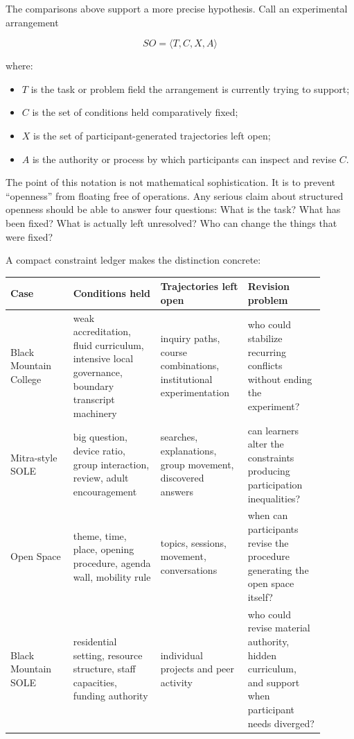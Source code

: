 \documentclass[11pt]{article}
\begin{document}
The comparisons above support a more precise hypothesis. Call an experimental arrangement

\[
SO = \langle T, C, X, A \rangle
\]

where:

\begin{itemize}[leftmargin=1.6em]
\item $T$ is the task or problem field the arrangement is currently trying to support;
\item $C$ is the set of conditions held comparatively fixed;
\item $X$ is the set of participant-generated trajectories left open;
\item $A$ is the authority or process by which participants can inspect and revise $C$.
\end{itemize}

The point of this notation is not mathematical sophistication. It is to prevent ``openness'' from floating free of operations. Any serious claim about structured openness should be able to answer four questions: What is the task? What has been fixed? What is actually left unresolved? Who can change the things that were fixed?

A compact constraint ledger makes the distinction concrete:

\begin{center}
\small
\begin{tabular}{p{0.18\linewidth} p{0.25\linewidth} p{0.25\linewidth} p{0.22\linewidth}}
\toprule
\textbf{Case} & \textbf{Conditions held} & \textbf{Trajectories left open} & \textbf{Revision problem} \\
\midrule
Black Mountain College & weak accreditation, fluid curriculum, intensive local governance, boundary transcript machinery & inquiry paths, course combinations, institutional experimentation & who could stabilize recurring conflicts without ending the experiment? \\
\addlinespace
Mitra-style SOLE & big question, device ratio, group interaction, review, adult encouragement & searches, explanations, group movement, discovered answers & can learners alter the constraints producing participation inequalities? \\
\addlinespace
Open Space & theme, time, place, opening procedure, agenda wall, mobility rule & topics, sessions, movement, conversations & when can participants revise the procedure generating the open space itself? \\
\addlinespace
Black Mountain SOLE & residential setting, resource structure, staff capacities, funding authority & individual projects and peer activity & who could revise material authority, hidden curriculum, and support when participant needs diverged? \\
\bottomrule
\end{tabular}
\end{center}
\end{document}
